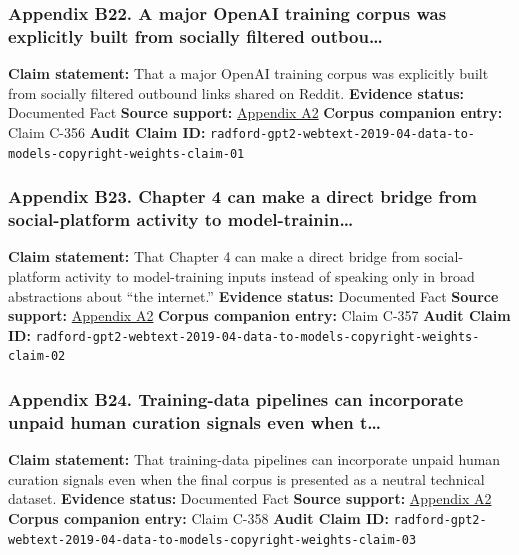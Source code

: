 \documentclass[
  american,
  11pt,
  letterpaper,
]{article}
\begin{document}
\subsubsection{Appendix B22. A major OpenAI training corpus was
explicitly built from socially filtered
outbou\ldots{}}\label{ch-04-appendix-b22-a-major-openai-training-corpus-was-explicitly-built-from-socially-filtered-outbou}

\textbf{Claim statement:} That a major OpenAI training corpus was
explicitly built from socially filtered outbound links shared on Reddit.
\textbf{Evidence status:} Documented Fact \textbf{Source support:}
\hyperref[ch-04-appendix-a2-language-models-are-unsupervised-multitask-learners]{Appendix
A2} \textbf{Corpus companion entry:} Claim C-356 \textbf{Audit Claim
ID:}
\texttt{radford-gpt2-webtext-2019-04-data-to-models-copyright-weights-claim-01}

\subsubsection{Appendix B23. Chapter 4 can make a direct bridge from
social-platform activity to
model-trainin\ldots{}}\label{ch-04-appendix-b23-chapter-4-can-make-a-direct-bridge-from-social-platform-activity-to-model-trainin}

\textbf{Claim statement:} That Chapter 4 can make a direct bridge from
social-platform activity to model-training inputs instead of speaking
only in broad abstractions about ``the internet.'' \textbf{Evidence
status:} Documented Fact \textbf{Source support:}
\hyperref[ch-04-appendix-a2-language-models-are-unsupervised-multitask-learners]{Appendix
A2} \textbf{Corpus companion entry:} Claim C-357 \textbf{Audit Claim
ID:}
\texttt{radford-gpt2-webtext-2019-04-data-to-models-copyright-weights-claim-02}

\subsubsection{Appendix B24. Training-data pipelines can incorporate
unpaid human curation signals even when
t\ldots{}}\label{ch-04-appendix-b24-training-data-pipelines-can-incorporate-unpaid-human-curation-signals-even-when-t}

\textbf{Claim statement:} That training-data pipelines can incorporate
unpaid human curation signals even when the final corpus is presented as
a neutral technical dataset. \textbf{Evidence status:} Documented Fact
\textbf{Source support:}
\hyperref[ch-04-appendix-a2-language-models-are-unsupervised-multitask-learners]{Appendix
A2} \textbf{Corpus companion entry:} Claim C-358 \textbf{Audit Claim
ID:}
\texttt{radford-gpt2-webtext-2019-04-data-to-models-copyright-weights-claim-03}
\end{document}
